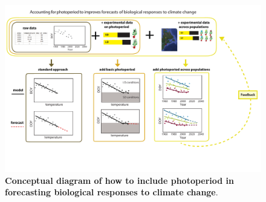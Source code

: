 \documentclass{article}
\begin{document}
\begin{figure}[p]
\includegraphics{..//..//analyses/photoperiod/figures/photocondiag6.pdf} 
\caption{\textbf{Conceptual diagram of how to include photoperiod in forecasting biological responses to climate change}.}
 \label{fig:condiag}
 \end{figure}
 
\end{document}
